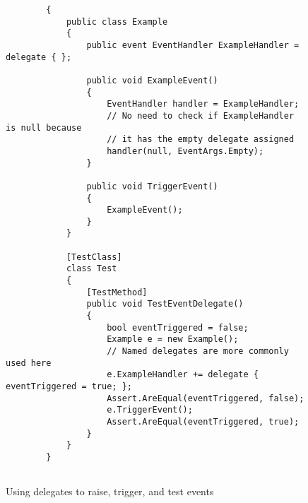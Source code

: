 \documentclass[../Main.tex]{subfiles}
\begin{document}
\begin{figure}[h]
    \begin{verbatim}
        {
            public class Example
            {
                public event EventHandler ExampleHandler = delegate { };
        
                public void ExampleEvent()
                {
                    EventHandler handler = ExampleHandler;
                    // No need to check if ExampleHandler is null because
                    // it has the empty delegate assigned
                    handler(null, EventArgs.Empty);
                }
    
                public void TriggerEvent()
                {
                    ExampleEvent();
                }
            }
    
            [TestClass]
            class Test
            {
                [TestMethod]
                public void TestEventDelegate() 
                {
                    bool eventTriggered = false;
                    Example e = new Example();
                    // Named delegates are more commonly used here
                    e.ExampleHandler += delegate { eventTriggered = true; };
                    Assert.AreEqual(eventTriggered, false);
                    e.TriggerEvent();
                    Assert.AreEqual(eventTriggered, true);
                }
            }
        }
        

    \end{verbatim}
    \caption{Using delegates to raise, trigger, and test events}
    \label{fig:DelegatesExample}
\end{figure}
\end{document}
